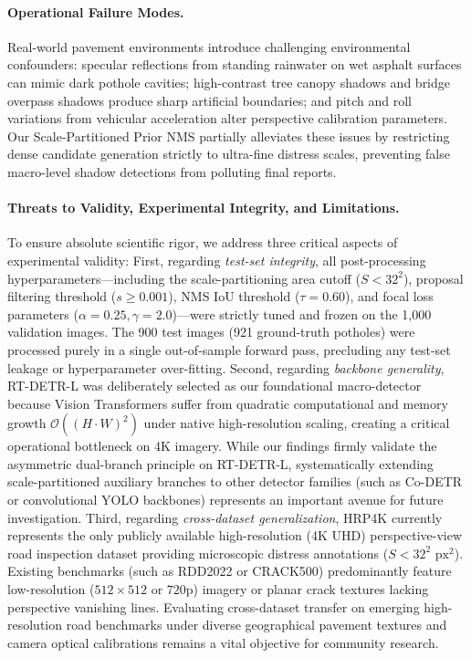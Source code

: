 \documentclass[runningheads]{llncs}
\begin{document}
\paragraph{Operational Failure Modes.}
Real-world pavement environments introduce challenging environmental confounders:
specular reflections from standing rainwater on wet asphalt surfaces can mimic dark pothole cavities;
high-contrast tree canopy shadows and bridge overpass shadows produce sharp artificial boundaries; and
pitch and roll variations from vehicular acceleration alter perspective calibration parameters.
Our Scale-Partitioned Prior NMS partially alleviates these issues by restricting dense candidate generation strictly to ultra-fine distress scales, preventing false macro-level shadow detections from polluting final reports.

\paragraph{Threats to Validity, Experimental Integrity, and Limitations.}
To ensure absolute scientific rigor, we address three critical aspects of experimental validity:
First, regarding \textit{test-set integrity}, all post-processing hyperparameters---including the scale-partitioning area cutoff ($S < 32^2$), proposal filtering threshold ($s \ge 0.001$), NMS IoU threshold ($\tau = 0.60$), and focal loss parameters ($\alpha = 0.25, \gamma = 2.0$)---were strictly tuned and frozen on the 1,000 validation images. The 900 test images (921 ground-truth potholes) were processed purely in a single out-of-sample forward pass, precluding any test-set leakage or hyperparameter over-fitting.
Second, regarding \textit{backbone generality}, RT-DETR-L was deliberately selected as our foundational macro-detector because Vision Transformers suffer from quadratic computational and memory growth $\mathcal{O}((H \cdot W)^2)$ under native high-resolution scaling, creating a critical operational bottleneck on 4K imagery. While our findings firmly validate the asymmetric dual-branch principle on RT-DETR-L, systematically extending scale-partitioned auxiliary branches to other detector families (such as Co-DETR or convolutional YOLO backbones) represents an important avenue for future investigation.
Third, regarding \textit{cross-dataset generalization}, HRP4K currently represents the only publicly available high-resolution (4K UHD) perspective-view road inspection dataset providing microscopic distress annotations ($S < 32^2\text{ px}^2$). Existing benchmarks (such as RDD2022 or CRACK500) predominantly feature low-resolution ($512 \times 512$ or $720\text{p}$) imagery or planar crack textures lacking perspective vanishing lines. Evaluating cross-dataset transfer on emerging high-resolution road benchmarks under diverse geographical pavement textures and camera optical calibrations remains a vital objective for community research.
\end{document}
